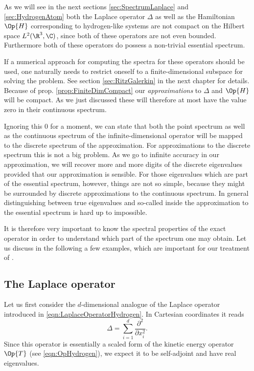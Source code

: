 \begin{rem}
	\label{rem:NumericalEssentialSpectrum}
As we will see in the next sections \vref{sec:SpectrumLaplace}
and \vref{sec:HydrogenAtom} both the Laplace operator $\Delta$ as well as the
Hamiltonian $\Op{H}$ corresponding to hydrogen-like systems
are not compact on the Hilbert space $L^2(\R^3, \C)$,
since both of these operators are not even bounded.
Furthermore both of these operators do possess a non-trivial essential spectrum.

If a numerical approach for computing the spectra for these operators
should be used,
one naturally needs to restrict oneself to a finite-dimensional subspace
for solving the problem.
See section \vref{sec:RitzGalerkin} in the next chapter for details.
Because of prop. \vref{prop:FiniteDimCompact} our \emph{approximations}
to $\Delta$ and $\Op{H}$ will be compact.
As we just discussed these will therefore
at most have the value zero in their continuous spectrum.

Ignoring this $0$ for a moment,
we can state that
both the point spectrum as well as the continuous spectrum
of the infinite-dimensional operator will be mapped to the discrete
spectrum of the approximation.
For approximations to the discrete spectrum this is not a big problem.
As we go to infinite accuracy in our approximation,
we will recover more and more digits of the discrete eigenvalues
provided that our approximation is sensible.
For those eigenvalues which are part of the essential spectrum, however,
things are not so simple, because they might be surrounded by
discrete approximations to the continuous spectrum.
In general distinguishing between true eigenvalues
and so-called  inside the approximation
to the essential spectrum is hard up to impossible.
\end{rem}

It is therefore very important to know
the spectral properties of the exact operator
in order to understand which part of the spectrum one may obtain.
Let us discuss in the following a few examples,
which are important for our treatment of \QM.

\subsection{The Laplace operator}
\label{sec:SpectrumLaplace}
Let us first consider the $d$-dimensional analogue of the Laplace operator
introduced in \eqref{eqn:LaplaceOperatorHydrogen}.
In Cartesian coordinates it reads
\begin{equation}
	\Delta = \sum_{i=1}^d \frac{\partial^2}{\partial x_i^2}.
	\label{eqn:LaplaceOperatorD}
\end{equation}
Since this operator is essentially a scaled form of the kinetic energy operator $\Op{T}$
(see \eqref{eqn:OpHydrogen}),
we expect it to be self-adjoint and have real eigenvalues.

